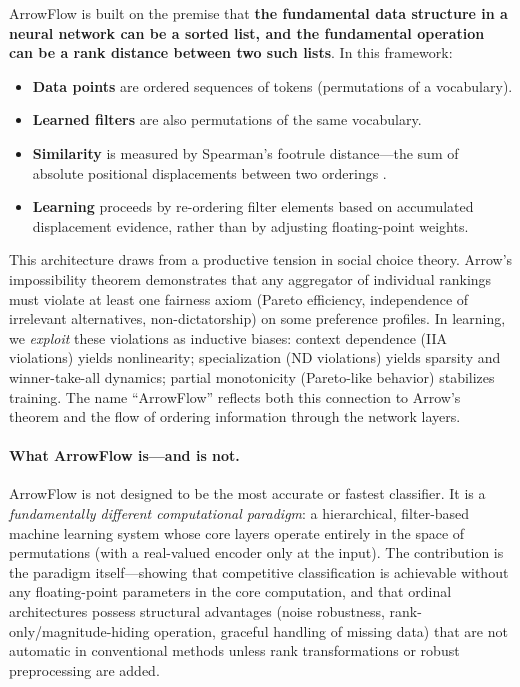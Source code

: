 \documentclass[12pt]{article}
\begin{document}
ArrowFlow is built on the premise that \textbf{the fundamental data structure in a neural network can be a sorted list, and the fundamental operation can be a rank distance between two such lists}. In this framework:

\begin{itemize}[leftmargin=2em]
  \item \textbf{Data points} are ordered sequences of tokens (permutations of a vocabulary).
  \item \textbf{Learned filters} are also permutations of the same vocabulary.
  \item \textbf{Similarity} is measured by Spearman's footrule distance---the sum of absolute positional displacements between two orderings \citep{diaconis1977footrule}.
  \item \textbf{Learning} proceeds by re-ordering filter elements based on accumulated displacement evidence, rather than by adjusting floating-point weights.
\end{itemize}

This architecture draws from a productive tension in social choice theory. Arrow's impossibility theorem \citep{arrow1951social} demonstrates that any aggregator of individual rankings must violate at least one fairness axiom (Pareto efficiency, independence of irrelevant alternatives, non-dictatorship) on some preference profiles. In learning, we \emph{exploit} these violations as inductive biases: context dependence (IIA violations) yields nonlinearity; specialization (ND violations) yields sparsity and winner-take-all dynamics; partial monotonicity (Pareto-like behavior) stabilizes training. The name ``ArrowFlow'' reflects both this connection to Arrow's theorem and the flow of ordering information through the network layers.

\paragraph{What ArrowFlow is---and is not.}
ArrowFlow is not designed to be the most accurate or fastest classifier. It is a \emph{fundamentally different computational paradigm}: a hierarchical, filter-based machine learning system whose core layers operate entirely in the space of permutations (with a real-valued encoder only at the input). The contribution is the paradigm itself---showing that competitive classification is achievable without any floating-point parameters in the core computation, and that ordinal architectures possess structural advantages (noise robustness, rank-only/magnitude-hiding operation, graceful handling of missing data) that are not automatic in conventional methods unless rank transformations or robust preprocessing are added.
\end{document}
